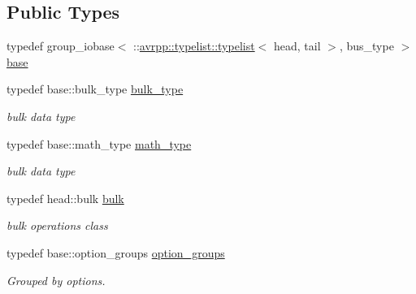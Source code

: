 \subsection*{Public Types}
\begin{DoxyCompactItemize}
\item 
typedef group\_\-iobase$<$ ::\hyperlink{structavrpp_1_1typelist_1_1typelist}{avrpp::typelist::typelist}$<$ head, tail $>$, bus\_\-type $>$ \hyperlink{structavrpp_1_1bus_1_1group__input_3_01_1_1avrpp_1_1typelist_1_1typelist_3_01head_00_01tail_01_4_00_01bus__type_01_4_a758a4f561ac4b89692ba64751aaf2afb}{base}
\item 
typedef base::bulk\_\-type \hyperlink{structavrpp_1_1bus_1_1group__input_3_01_1_1avrpp_1_1typelist_1_1typelist_3_01head_00_01tail_01_4_00_01bus__type_01_4_a65f2a153fc07f1aa2bc497f2c32800ef}{bulk\_\-type}
\begin{DoxyCompactList}\small\item\em bulk data type \item\end{DoxyCompactList}\item 
typedef base::math\_\-type \hyperlink{structavrpp_1_1bus_1_1group__input_3_01_1_1avrpp_1_1typelist_1_1typelist_3_01head_00_01tail_01_4_00_01bus__type_01_4_a23cdc8f3ffca194e693a006c5140244d}{math\_\-type}
\begin{DoxyCompactList}\small\item\em bulk data type \item\end{DoxyCompactList}\item 
typedef head::bulk \hyperlink{structavrpp_1_1bus_1_1group__input_3_01_1_1avrpp_1_1typelist_1_1typelist_3_01head_00_01tail_01_4_00_01bus__type_01_4_a78526007dcd6a1d1e7e2a33d4ab36e6d}{bulk}
\begin{DoxyCompactList}\small\item\em bulk operations class \item\end{DoxyCompactList}\item 
typedef base::option\_\-groups \hyperlink{structavrpp_1_1bus_1_1group__input_3_01_1_1avrpp_1_1typelist_1_1typelist_3_01head_00_01tail_01_4_00_01bus__type_01_4_a839b778c3b94a101da470fa0563ee178}{option\_\-groups}
\begin{DoxyCompactList}\small\item\em Grouped by options. \item\end{DoxyCompactList}\end{DoxyCompactItemize}
